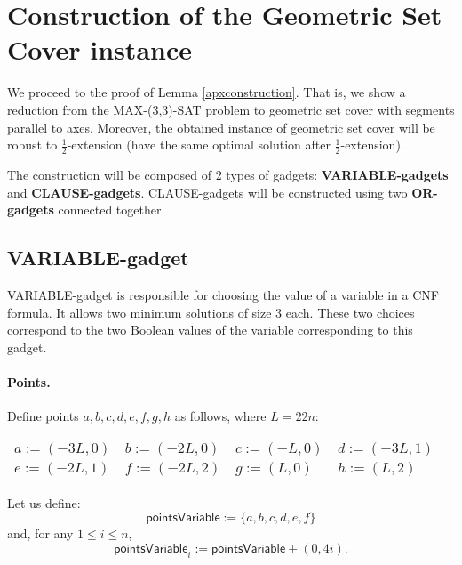 \section{Construction of the Geometric Set Cover instance}
\label{construction_description}
We proceed to the proof of Lemma \ref{apxconstruction}.
That is, we show a reduction from the MAX-(3,3)-SAT problem
to geometric set cover with segments
parallel to axes. Moreover, the obtained instance
of geometric set cover will be robust
to $\frac{1}{2}$-extension (have the same optimal solution
after $\frac{1}{2}$-extension).

The construction will be composed of 2 types of gadgets:
\textbf{VARIABLE-gadgets} and \textbf{CLAUSE-gadgets}.
CLAUSE-gadgets will be constructed using two \textbf{OR-gadgets}
connected together.

\subsection{VARIABLE-gadget}

VARIABLE-gadget is responsible for choosing the value of a variable
in a CNF formula. It allows two minimum solutions of size 3 each.
These two choices correspond to the two Boolean values of the variable
corresponding to this gadget.

\paragraph{Points.}

Define points $a,b,c,d,e,f,g,h$ as follows, where $L = 22n$:


\newcommand{\pointsVarNoArg}{\mathsf{pointsVariable} }
\newcommand{\pointsVar}[1]{\mathsf{pointsVariable}_{#1} }
\newcommand{\chooseVar}[2]{\mathsf{chooseVariable}^{#1}_{#2} }
\newcommand{\segmentsVar}[1]{\mathsf{segmentsVariable}_{#1} }



\begin{center}
\begin{tabular}{ l l l l}
	$a := (-3L, 0)$ &
	$b := (-2L, 0)$ & 
	$c := (-L, 0)$ & 
	$d := (-3L, 1)$ \\  
	$e := (-2L, 1)$ & 
	$f := (-2L, 2)$ &
	$g := (L, 0)$ &
	$h := (L, 2)$
\end{tabular}
\end{center}


Let us define:
$$\pointsVarNoArg :=  \{a, b, c, d, e, f\}$$
and, for any $1 \le i \le n$,
$$\pointsVar{i} := \pointsVarNoArg + (0, 4i).$$


